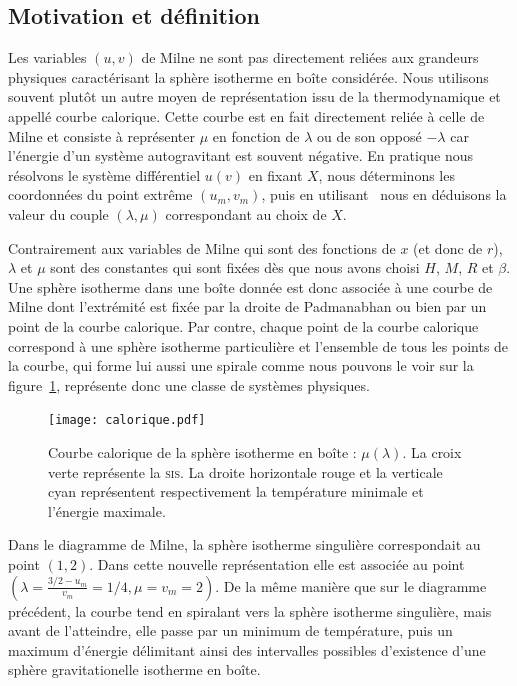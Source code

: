 \subsection{Motivation et définition}
	
	Les variables $(u,v)$ de Milne ne sont pas directement reliées aux grandeurs physiques caractérisant la sphère
	isotherme en boîte considérée. Nous utilisons souvent plutôt un autre moyen de représentation issu de la
	thermodynamique et appellé courbe calorique. Cette courbe est en fait directement reliée à celle de Milne et
	consiste à représenter $\mu$ en fonction de $\lambda$ ou de son opposé $-\lambda$ car l'énergie d'un système
	autogravitant est souvent négative. En pratique nous résolvons le système différentiel $u(v)$ en fixant $X$,
	nous déterminons les coordonnées du point extrême $(u_m,v_m)$, puis en utilisant~ nous en déduisons la valeur
	du couple $(\lambda,\mu)$ correspondant au choix de $X$.
	
	Contrairement aux variables de Milne qui sont des fonctions de $x$ (et donc de $r$), $\lambda$ et $\mu$ sont des
	constantes qui sont fixées dès que nous avons choisi $H$, $M$, $R$ et $\beta$. Une sphère isotherme dans une boîte
	donnée est donc associée à une courbe de Milne dont l'extrémité est fixée par la droite de Padmanabhan ou bien
	par un point de la courbe calorique. Par contre, chaque point de la courbe calorique correspond à une sphère isotherme
	particulière et l'ensemble de tous les points de la courbe, qui forme lui aussi une spirale comme nous pouvons le
	voir sur la figure~\ref{Ener}, représente donc une classe de systèmes physiques.
	
	\begin{figure}[h!]
		\centering \texttt{[image: calorique.pdf]}
		\caption{Courbe calorique de la sphère isotherme en boîte : $\mu(\lambda)$. La croix verte représente la \textsc{sis}. La droite horizontale
		rouge et la verticale cyan représentent respectivement la température minimale et l'énergie maximale.}
		\label{Ener}
	\end{figure}

	Dans le diagramme de Milne, la sphère isotherme singulière correspondait au point $\left(1,2\right)$. Dans cette nouvelle représentation elle
	est associée au point $\left(\lambda = \frac{3/2 - u_m}{v_m} = 1/4, \mu = v_m = 2\right)$. De la même manière que sur le diagramme précédent,
	la courbe tend en spiralant vers la sphère isotherme singulière, mais avant de l'atteindre, elle passe par un minimum de température, puis un
	maximum d'énergie délimitant ainsi des intervalles possibles d'existence d'une sphère gravitationelle isotherme en boîte.


